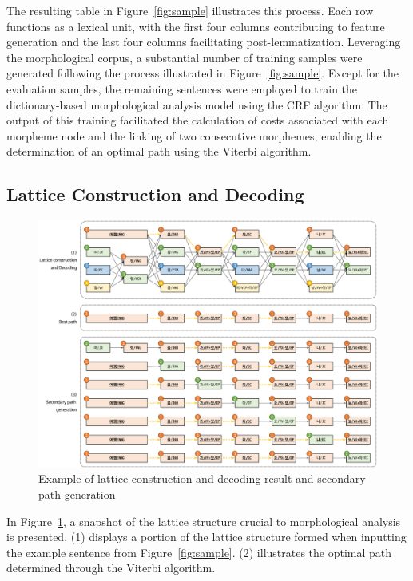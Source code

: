 \documentclass[AMS,STIX2COL]{WileyNJD-v2}
\begin{document}
    The resulting table in Figure~\ref{fig:sample} illustrates this process.
    Each row functions as a lexical unit, with the first four columns contributing to feature generation and the last four columns facilitating post-lemmatization.
    Leveraging the morphological corpus, a substantial number of training samples were generated following the process illustrated in Figure~\ref{fig:sample}.
    Except for the evaluation samples, the remaining sentences were employed to train the dictionary-based morphological analysis model using the CRF algorithm.
    The output of this training facilitated the calculation of costs associated with each morpheme node and the linking of two consecutive morphemes, enabling the determination of an optimal path using the Viterbi algorithm.

    \subsection{Lattice Construction and Decoding}\label{subsec:lattice-construction-and-decoding}

    \begin{figure}[ht]
        \centerline{\includegraphics[width=1.0\textwidth]{fig;lattice-v3}}
        \caption{Example of lattice construction and decoding result and secondary path generation}
        \label{fig:lattice}
    \end{figure}

    In Figure~\ref{fig:lattice}, a snapshot of the lattice structure crucial to morphological analysis is presented.
    (1) displays a portion of the lattice structure formed when inputting the example sentence from Figure~\ref{fig:sample}.
    (2) illustrates the optimal path determined through the Viterbi algorithm.
\end{document}
